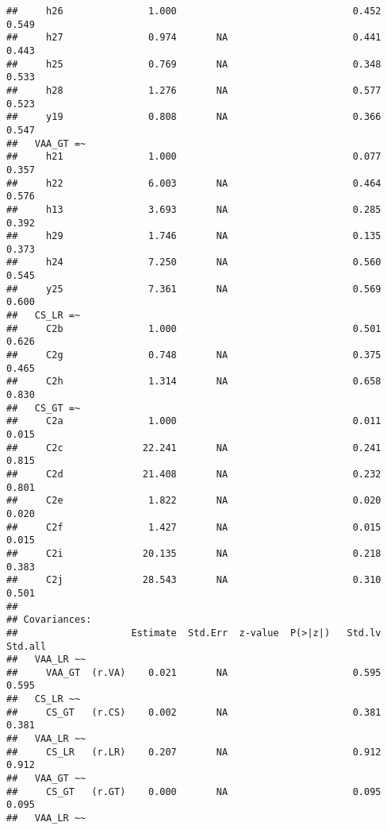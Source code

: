 \documentclass[
]{article}
\begin{document}
\begin{verbatim}
##     h26               1.000                               0.452    0.549
##     h27               0.974       NA                      0.441    0.443
##     h25               0.769       NA                      0.348    0.533
##     h28               1.276       NA                      0.577    0.523
##     y19               0.808       NA                      0.366    0.547
##   VAA_GT =~                                                             
##     h21               1.000                               0.077    0.357
##     h22               6.003       NA                      0.464    0.576
##     h13               3.693       NA                      0.285    0.392
##     h29               1.746       NA                      0.135    0.373
##     h24               7.250       NA                      0.560    0.545
##     y25               7.361       NA                      0.569    0.600
##   CS_LR =~                                                              
##     C2b               1.000                               0.501    0.626
##     C2g               0.748       NA                      0.375    0.465
##     C2h               1.314       NA                      0.658    0.830
##   CS_GT =~                                                              
##     C2a               1.000                               0.011    0.015
##     C2c              22.241       NA                      0.241    0.815
##     C2d              21.408       NA                      0.232    0.801
##     C2e               1.822       NA                      0.020    0.020
##     C2f               1.427       NA                      0.015    0.015
##     C2i              20.135       NA                      0.218    0.383
##     C2j              28.543       NA                      0.310    0.501
## 
## Covariances:
##                    Estimate  Std.Err  z-value  P(>|z|)   Std.lv  Std.all
##   VAA_LR ~~                                                             
##     VAA_GT  (r.VA)    0.021       NA                      0.595    0.595
##   CS_LR ~~                                                              
##     CS_GT   (r.CS)    0.002       NA                      0.381    0.381
##   VAA_LR ~~                                                             
##     CS_LR   (r.LR)    0.207       NA                      0.912    0.912
##   VAA_GT ~~                                                             
##     CS_GT   (r.GT)    0.000       NA                      0.095    0.095
##   VAA_LR ~~                                                             

\end{verbatim}
\end{document}
